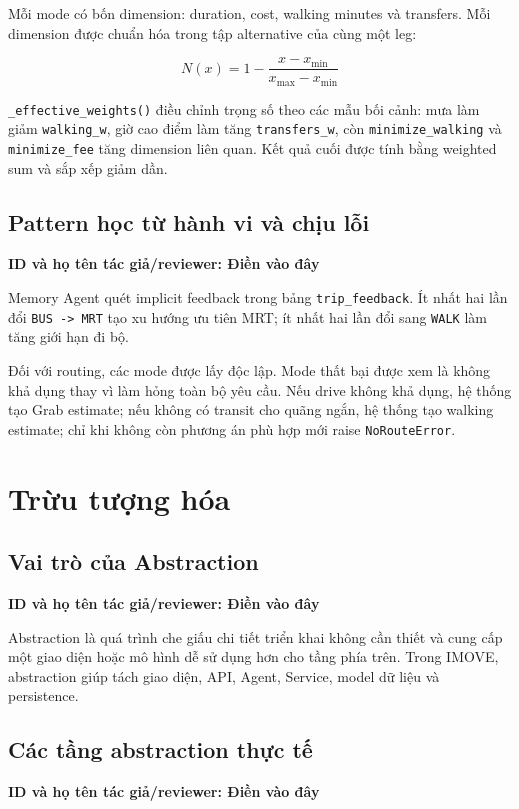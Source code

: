 \documentclass[12pt,a4paper]{article}
\newcommand{\tacgia}{%
  \begin{tcolorbox}[colback=blue!3,colframe=blue!25,boxrule=0.4pt,arc=1mm]
    \small\textbf{ID và họ tên tác giả/reviewer: Điền vào đây}
  \end{tcolorbox}
}
\begin{document}
Mỗi mode có bốn dimension: duration, cost, walking minutes và transfers. Mỗi dimension được chuẩn hóa trong tập alternative của cùng một leg:

\[
N(x) = 1 - \frac{x - x_{\min}}{x_{\max} - x_{\min}}
\]

\texttt{\_effective\_weights()} điều chỉnh trọng số theo các mẫu bối cảnh: mưa làm giảm \texttt{walking\_w}, giờ cao điểm làm tăng \texttt{transfers\_w}, còn \texttt{minimize\_walking} và \texttt{minimize\_fee} tăng dimension liên quan. Kết quả cuối được tính bằng weighted sum và sắp xếp giảm dần.

\subsection{Pattern học từ hành vi và chịu lỗi}
\tacgia

Memory Agent quét implicit feedback trong bảng \texttt{trip\_feedback}. Ít nhất hai lần đổi \texttt{BUS -> MRT} tạo xu hướng ưu tiên MRT; ít nhất hai lần đổi sang \texttt{WALK} làm tăng giới hạn đi bộ.

Đối với routing, các mode được lấy độc lập. Mode thất bại được xem là không khả dụng thay vì làm hỏng toàn bộ yêu cầu. Nếu drive không khả dụng, hệ thống tạo Grab estimate; nếu không có transit cho quãng ngắn, hệ thống tạo walking estimate; chỉ khi không còn phương án phù hợp mới raise \texttt{NoRouteError}.

\section{Trừu tượng hóa}

\subsection{Vai trò của Abstraction}
\tacgia

Abstraction là quá trình che giấu chi tiết triển khai không cần thiết và cung cấp một giao diện hoặc mô hình dễ sử dụng hơn cho tầng phía trên. Trong IMOVE, abstraction giúp tách giao diện, API, Agent, Service, model dữ liệu và persistence.

\subsection{Các tầng abstraction thực tế}
\tacgia
\end{document}
